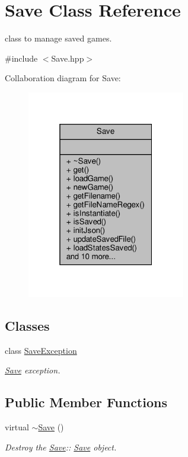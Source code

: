 \hypertarget{class_save}{}\section{Save Class Reference}
\label{class_save}


class to manage saved games.  




{\ttfamily \#include $<$Save.\+hpp$>$}



Collaboration diagram for Save\+:
\nopagebreak
\begin{figure}[H]
\begin{center}
\leavevmode
\includegraphics[width=196pt]{class_save__coll__graph}
\end{center}
\end{figure}
\subsection*{Classes}
\begin{DoxyCompactItemize}
\item 
class \hyperlink{class_save_1_1_save_exception}{Save\+Exception}
\begin{DoxyCompactList}\small\item\em \hyperlink{class_save}{Save} exception. \end{DoxyCompactList}\end{DoxyCompactItemize}
\subsection*{Public Member Functions}
\begin{DoxyCompactItemize}
\item 
\mbox{\label{class_save_a41dec94fb3d6fcce23117a20507c5d0d}} 
virtual \hyperlink{class_save_a41dec94fb3d6fcce23117a20507c5d0d}{$\sim$\+Save} ()
\begin{DoxyCompactList}\small\item\em Destroy the \hyperlink{class_save}{Save}\+:\+: \hyperlink{class_save}{Save} object. \end{DoxyCompactList}\end{DoxyCompactItemize}
